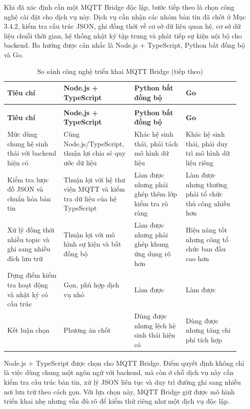 \documentclass[a4paper]{extarticle}
\newcommand{\thesissettableid}[2]{%
  \renewcommand{\thetable}{#1}%
  \renewcommand{\theHtable}{#2}%
}
\begin{document}
Khi đã xác định cần một MQTT Bridge độc lập, bước tiếp theo là chọn công nghệ
cài đặt cho dịch vụ này. Dịch vụ cần nhận các nhóm bản tin đã chốt ở Mục
3.4.2, kiểm tra cấu trúc JSON, ghi đồng thời về cơ sở dữ liệu quan hệ, cơ sở
dữ liệu chuỗi thời gian, hệ thống nhật ký tập trung và phát tiếp sự kiện nội bộ cho
backend. Ba hướng được cân nhắc là Node.js + TypeScript, Python bất đồng bộ và
Go.

{\thesissettableid{3.32}{condensed-bang-3-32-so-sanh-cong-nghe-trien-khai-mqtt-bridge}
\def\LTcaptype{table}
\begin{longtable}{|L{0.239\linewidth}|L{0.273\linewidth}|L{0.211\linewidth}|L{0.228\linewidth}|}
\caption{So sánh công nghệ triển khai MQTT Bridge}\label{tab:condensed-bang-3-32-so-sanh-cong-nghe-trien-khai-mqtt-bridge}\\
\hline
\textbf{Tiêu chí} & \textbf{Node.js + TypeScript} & \textbf{Python bất đồng bộ} & \textbf{Go} \\
\hline
\endfirsthead
\caption[]{So sánh công nghệ triển khai MQTT Bridge (tiếp theo)}\\
\hline
\textbf{Tiêu chí} & \textbf{Node.js + TypeScript} & \textbf{Python bất đồng bộ} & \textbf{Go} \\
\hline
\endhead
\endfoot
\endlastfoot
Mức dùng chung hệ sinh thái với backend hiện có & Cùng Node.js/TypeScript, thuận lợi chia sẻ quy ước dữ liệu & Khác hệ sinh thái, phải tách mô hình dữ liệu & Khác hệ sinh thái, phải duy trì mô hình dữ liệu riêng \\\hline
Kiểm tra lược đồ JSON và chuẩn hóa bản tin & Thuận lợi với hệ thư viện MQTT và kiểm tra dữ liệu của hệ TypeScript & Làm được nhưng phải ghép thêm lớp kiểm tra rõ ràng & Làm được nhưng thường phải tổ chức thủ công nhiều hơn \\\hline
Xử lý đồng thời nhiều topic và ghi sang nhiều đích lưu trữ & Thuận lợi với mô hình sự kiện và bất đồng bộ & Làm được nhưng phải ghép khung ứng dụng rõ hơn & Hiệu năng tốt nhưng công tổ chức ban đầu cao hơn \\\hline
Dựng điểm kiểm tra hoạt động và nhật ký có cấu trúc & Gọn, phù hợp dịch vụ nhỏ & Làm được & Làm được \\\hline
Kết luận chọn & Phương án chốt & Dùng được nhưng lệch hệ sinh thái hiện có & Dùng được nhưng tăng chi phí tích hợp \\\hline
\end{longtable}
}

Node.js + TypeScript được chọn cho MQTT Bridge. Điểm quyết định không chỉ là
việc dùng chung một ngôn ngữ với backend, mà còn ở chỗ dịch vụ này cần kiểm tra
cấu trúc bản tin, xử lý JSON liên tục và duy trì đường ghi sang nhiều nơi lưu
trữ theo cách gọn. Với lựa chọn này, MQTT Bridge giữ được mô hình triển khai
nhẹ nhưng vẫn đủ rõ để kiểm thử riêng như một dịch vụ độc lập.
\end{document}
